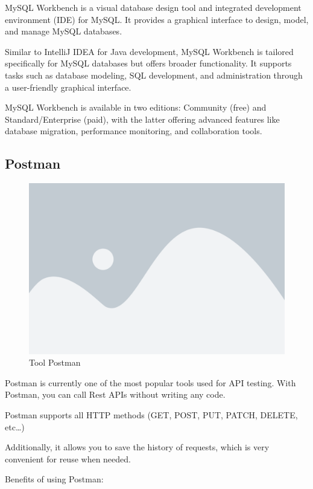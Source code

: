 \documentclass[../Main.tex]{subfiles}
\begin{document}
MySQL Workbench is a visual database design tool and integrated development environment (IDE) for MySQL.
It provides a graphical interface to design, model, and manage MySQL databases.

Similar to IntelliJ IDEA for Java development, MySQL Workbench is tailored specifically for MySQL databases but offers broader functionality.
It supports tasks such as database modeling, SQL development, and administration through a user-friendly graphical interface.

MySQL Workbench is available in two editions: Community (free) and Standard/Enterprise (paid), with the latter offering advanced features like database migration, performance monitoring, and collaboration tools.

\subsection{Postman}

\begin{figure}[H]
    \centering
    \includegraphics[width=\textwidth]{Figure/postman.png}
    \caption{Tool Postman}
    \label{fig:postman}
\end{figure}

Postman is currently one of the most popular tools used for API testing.
With Postman, you can call Rest APIs without writing any code.

Postman supports all HTTP methods (GET, POST, PUT, PATCH, DELETE, etc\dots)

Additionally, it allows you to save the history of requests, which is very convenient for reuse when needed.

Benefits of using Postman:
\end{document}
